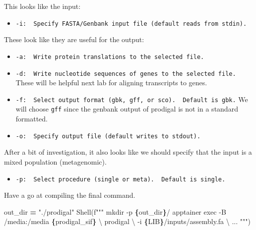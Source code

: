 \documentclass[
]{book}
\newenvironment{Shaded}{\begin{snugshade}}{\end{snugshade}}
\newcommand{\CharTok}[1]{\textcolor[rgb]{0.31,0.60,0.02}{#1}}
\newcommand{\NormalTok}[1]{#1}
\newcommand{\OperatorTok}[1]{\textcolor[rgb]{0.81,0.36,0.00}{\textbf{#1}}}
\newcommand{\SpecialCharTok}[1]{\textcolor[rgb]{0.81,0.36,0.00}{\textbf{#1}}}
\newcommand{\SpecialStringTok}[1]{\textcolor[rgb]{0.31,0.60,0.02}{#1}}
\newcommand{\StringTok}[1]{\textcolor[rgb]{0.31,0.60,0.02}{#1}}
\providecommand{\tightlist}{%
  \setlength{\itemsep}{0pt}\setlength{\parskip}{0pt}}
\begin{document}
This looks like the input:

\begin{itemize}
\tightlist
\item
  \texttt{-i:\ \ Specify\ FASTA/Genbank\ input\ file\ (default\ reads\ from\ stdin).}
\end{itemize}

These look like they are useful for the output:

\begin{itemize}
\tightlist
\item
  \texttt{-a:\ \ Write\ protein\ translations\ to\ the\ selected\ file.}
\item
  \texttt{-d:\ \ Write\ nucleotide\ sequences\ of\ genes\ to\ the\ selected\ file.} These will be helpful next lab for aligning transcripts to genes.
\item
  \texttt{-f:\ \ Select\ output\ format\ (gbk,\ gff,\ or\ sco).\ \ Default\ is\ gbk.} We will choose \texttt{gff} since the genbank output of prodigal is not in a standard formatted.
\item
  \texttt{-o:\ \ Specify\ output\ file\ (default\ writes\ to\ stdout).}
\end{itemize}

After a bit of investigation, it also looks like we should specify that the input is a mixed population (metagenomic).

\begin{itemize}
\tightlist
\item
  \texttt{-p:\ \ Select\ procedure\ (single\ or\ meta).\ \ Default\ is\ single.}
\end{itemize}

Have a go at compiling the final command.

\begin{Shaded}
\begin{Highlighting}[numbers=left,,]
\NormalTok{out\_dir }\OperatorTok{=} \StringTok{"./prodigal"}
\NormalTok{Shell(}\SpecialStringTok{f"""}
\SpecialStringTok{mkdir {-}p }\SpecialCharTok{\{}\NormalTok{out\_dir}\SpecialCharTok{\}}\SpecialStringTok{/}
\SpecialStringTok{apptainer exec {-}B /media:/media }\SpecialCharTok{\{}\NormalTok{prodigal\_sif}\SpecialCharTok{\}}\SpecialStringTok{ }\CharTok{\textbackslash{}}
\SpecialStringTok{    prodigal }\CharTok{\textbackslash{}}
\SpecialStringTok{        {-}i }\SpecialCharTok{\{}\NormalTok{LIB}\SpecialCharTok{\}}\SpecialStringTok{/inputs/assembly.fa }\CharTok{\textbackslash{}}
\SpecialStringTok{        ...}
\SpecialStringTok{"""}\NormalTok{)}
\end{Highlighting}
\end{Shaded}
\end{document}
